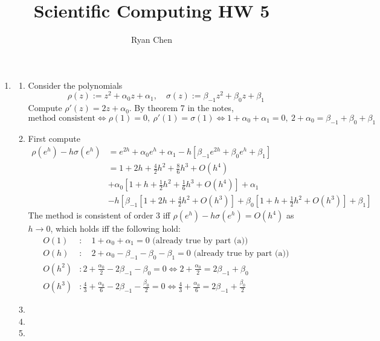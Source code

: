 \documentclass{article}
\title{Scientific Computing HW 5}
\author{Ryan Chen}
\newcommand{\sbr}[1]{\left[#1\right]}
\newcommand{\p}{\rho}
\newcommand{\s}{\sigma}
\renewcommand{\a}{\alpha}
\renewcommand{\b}{\beta}
\begin{document}
	
\maketitle


\begin{enumerate}
	


\item

\begin{enumerate}
	
	\item Consider the polynomials
	\[\p(z) := z^2+\a_0z+\a_1,
	\quad \s(z) := \b_{-1}z^2+\b_0z+\b_1\]
	Compute $\p'(z)=2z+\a_0$. By theorem 7 in the notes,
	\[\text{method consistent} \iff \p(1)=0,~\p'(1)=\s(1)
	\iff 1+\a_0+\a_1=0,~2+\a_0=\b_{-1}+\b_0+\b_1\]
	
	\item First compute
	\begin{align*}
		\p(e^h)-h\s(e^h) &= e^{2h} + \a_0e^h + \a_1 - h\sbr{\b_{-1}e^{2h} + \b_0e^h + \b_1} \\
		&= 1 + 2h + \frac42h^2 + \frac86h^3 + O(h^4) \\
		&+ \a_0\sbr{1 + h + \frac12h^2 + \frac16h^3 + O(h^4)} + \a_1 \\
		&- h\sbr{\b_{-1}\sbr{1 + 2h + \frac42h^2 + O(h^3)} + \b_0\sbr{1 + h + \frac12h^2 + O(h^3)} + \b_1}
	\end{align*}
	The method is consistent of order 3 iff $\p(e^h)-h\s(e^h)=O(h^4)$ as $h\to0$, which holds iff the following hold:
	\begin{align*}
		O(1)&: \quad 1+\a_0+\a_1=0 \text{ (already true by part (a))}\\
		O(h)&: \quad 2+\a_0-\b_{-1}-\b_0-\b_1=0 \text{ (already true by part (a))}\\
		O(h^2)&: 2+\frac{\a_0}{2}-2\b_{-1}-\b_0=0 \iff 2+\frac{\a_0}{2}=2\b_{-1}+\b_0 \\
		O(h^3)&: \frac43+\frac{\a_0}{6}-2\b_{-1}-\frac{\b_0}{2}=0 \iff \frac43+\frac{\a_0}{6}=2\b_{-1}+\frac{\b_0}{2}
	\end{align*}
	
	\item
	
	\item
	
	\item 
	
\end{enumerate}




\end{enumerate}
\end{document}

